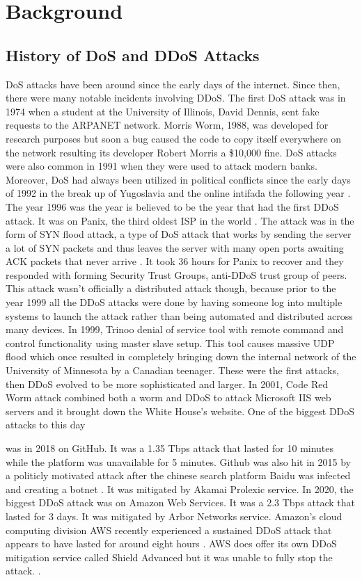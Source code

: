 \documentclass[a4paper, 12pt]{report} %
\begin{document}
    \section{Background}
        \subsection{History of DoS and DDoS Attacks}
            DoS attacks have been around since the early days of the internet. Since then, there were many notable incidents involving DDoS. The first DoS attack was in 1974 when a student at the University of Illinois, David Dennis, sent fake requests to the ARPANET network. Morris Worm, 1988, was developed for research purposes but soon a bug caused the code to copy itself everywhere on the network resulting its developer Robert Morris a \$10,000 fine. DoS attacks were also common in 1991 when they were used to attack modern banks. Moreover, DoS had always been utilized in political conflicts since the early days of 1992 in the break up of Yugoslavia and the online intifada the following year \cite{history_of_ddos}.
            The year 1996 was the year is believed to be the year that had the first DDoS attack. It was on Panix, the third oldest ISP in the world \cite{wikipediaDenialofserviceAttack}. The attack was in the form of SYN flood attack, a type of DoS attack that works by sending the server a lot of SYN packets and thus leaves the server with many open ports awaiting ACK packets that never arrive \cite{syn_flood_attack}. It took 36 hours for Panix to recover and they responded with forming Security Trust Groups, anti-DDoS trust group of peers. This attack wasn’t officially a distributed attack though, because prior to the year 1999 all the DDoS attacks were done by having someone log into multiple systems to launch the attack rather than being automated and distributed across many devices. In 1999, Trinoo denial of service tool with remote command and control functionality using master slave setup. This tool causes massive UDP flood which once resulted in completely bringing down the internal network of the University of Minnesota by a Canadian teenager. These were the first attacks, then DDoS evolved to be more sophisticated and larger. In 2001, Code Red Worm attack combined both a worm and DDoS to attack Microsoft IIS web servers and it brought down the White House's website. One of the biggest DDoS attacks to this day \date{\today} was in 2018 on GitHub. It was a 1.35 Tbps attack that lasted for 10 minutes while the platform was unavailable for 5 minutes. Github was also hit in 2015 by a politicly motivated attack after the chinese search platform Baidu was infected and creating a botnet \cite{history_of_ddos}. It was mitigated by Akamai Prolexic service. In 2020, the biggest DDoS attack was on Amazon Web Services. It was a 2.3 Tbps attack that lasted for 3 days. It was mitigated by Arbor Networks service. Amazon's cloud computing division AWS recently experienced a sustained DDoS attack that appears to have lasted for around eight hours \cite{a10networksLargestReported}. AWS does offer its own DDoS mitigation service called Shield Advanced but it was unable to fully stop the attack. \cite{amazonManagedDDoS}.
\end{document}
